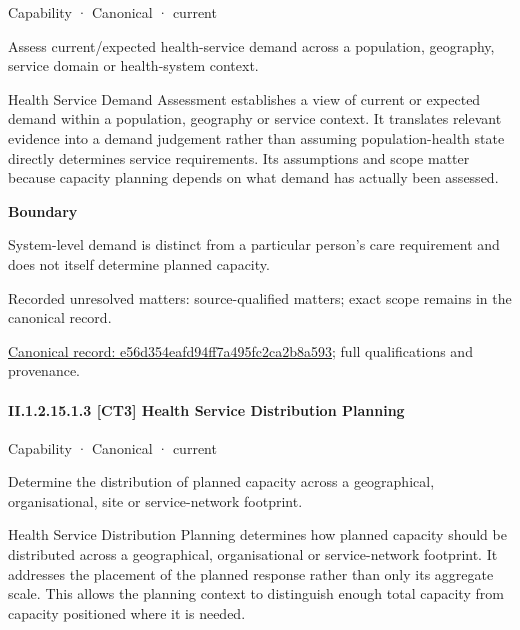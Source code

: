\label{element:e56d354eafd94ff7a495fc2ca2b8a593}
{\small Capability · Canonical · current}\par

Assess current/expected health-service demand across a population, geography, service domain or health-system context.



Health Service Demand Assessment establishes a view of current or expected demand within a population, geography or service context. It translates relevant evidence into a demand judgement rather than assuming population-health state directly determines service requirements. Its assumptions and scope matter because capacity planning depends on what demand has actually been assessed.



\textbf{Boundary}



System-level demand is distinct from a particular person's care requirement and does not itself determine planned capacity.


{\small Recorded unresolved matters: source-qualified matters; exact scope remains in the canonical record.}\par
{\footnotesize \href{../../../../continuum/strategy/capability/e56d354eafd94ff7a495fc2ca2b8a593.md}{Canonical record: e56d354eafd94ff7a495fc2ca2b8a593}; full qualifications and provenance.}\par
\paragraph*{II.1.2.15.1.3 [CT3] Health Service Distribution Planning}
\label{navigation:II.1.2.15.1.3}

\label{element:4fc525fccbe142a58ee43dcc58b11c92}
{\small Capability · Canonical · current}\par

Determine the distribution of planned capacity across a geographical, organisational, site or service-network footprint.



Health Service Distribution Planning determines how planned capacity should be distributed across a geographical, organisational or service-network footprint. It addresses the placement of the planned response rather than only its aggregate scale. This allows the planning context to distinguish enough total capacity from capacity positioned where it is needed.




